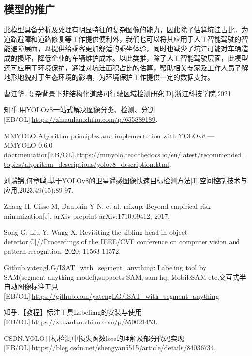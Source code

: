 \documentclass{MathorCupmodeling}
\begin{document}
	\subsection{模型的推广}
	此模型具备分析及处理有明显特征的复杂图像的能力，因此除了估算坑洼占比，为道路避障和道路修复等工作提供便利外，我们也可以将其应用于人工智能驾驶的智能避障层面，以提供给乘客更加舒适的乘坐体验，同时也减少了坑洼可能对车辆造成的损坏，降低企业的车辆维护成本。以此类推，除了人工智能驾驶层面，此模型还可应用于环境保护，通过对坑洼面积占比的估算，帮助相关专家及工作人员了解地形地貌对于生态环境的影响，为环境保护工作提供一定的数据支持。

	\newpage
	
	\begin{spacing}{1.08}
	\begin{thebibliography}{99}
	曹江华. 复杂背景下非结构化道路可行驶区域检测研究[D].浙江科技学院,2021.

	知乎.用YOLOv8一站式解决图像分类、检测、分割[EB/OL].\url{https://zhuanlan.zhihu.com/p/655889189}.

	MMYOLO.Algorithm principles and implementation with YOLOv8 — MMYOLO 0.6.0 documentation[EB/OL].\url{https://mmyolo.readthedocs.io/en/latest/recommended_topics/algorithm_descriptions/yolov8_description.html}.

	刘瑞锦,何章鸣.基于YOLOv8的卫星遥感图像快速目标检测方法[J].空间控制技术与应用,2023,49(05):89-97.

	Zhang H, Cisse M, Dauphin Y N, et al. mixup: Beyond empirical risk minimization[J]. arXiv preprint arXiv:1710.09412, 2017.

	Song G, Liu Y, Wang X. Revisiting the sibling head in object detector[C]//Proceedings of the IEEE/CVF conference on computer vision and pattern recognition. 2020: 11563-11572.

	Github.yatengLG/ISAT\_with\_segment\_anything: Labeling tool by SAM(segment anything model),supports SAM, sam-hq, MobileSAM etc.交互式半自动图像标注工具[EB/OL].\url{https://github.com/yatengLG/ISAT_with_segment_anything}.

	知乎.【教程】标注工具Labelimg的安装与使用[EB/OL].\url{https://zhuanlan.zhihu.com/p/550021453}.

	CSDN.YOLO目标检测中损失函数loss的理解及部分代码实现[EB/OL].\url{https://blog.csdn.net/shengyan5515/article/details/84036734}.


\end{thebibliography}
\end{spacing}
\end{document}
